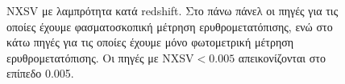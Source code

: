  
\begin{figure}%
    \centering
    \qquad
    \caption{ \textlatin{NXSV} με λαμπρότητα κατά \textlatin{redshift.} Στο πάνω πάνελ οι πηγές για τις οποίες έχουμε φασματοσκοπική μέτρηση ερυθρομετατόπισης, ενώ στο κάτω πηγές για τις οποίες έχουμε μόνο φωτομετρική μέτρηση ερυθρομετατόπισης. Οι πηγές με \textlatin{NXSV}$<0.005$ απεικονίζονται στο επίπεδο 0.005.} \label{fig:NXSV-Zcbar}
\end{figure}

